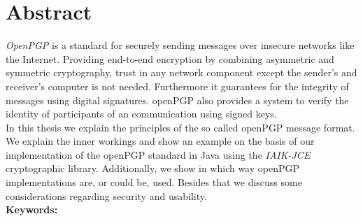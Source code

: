 

\chapter*{Abstract}
\label{cha:abstract}



\emph{OpenPGP} is a standard for securely sending messages over insecure networks like the Internet. Providing end-to-end encryption by combining asymmetric and symmetric cryptography, trust in any network component except the sender's and receiver's computer is not needed. Furthermore it guarantees for the integrity of messages using digital signatures. openPGP also provides a system to verify the identity of participants of an communication using signed keys. \\
 
 
 In this thesis we explain the principles of the so called openPGP message format. 
 We explain the inner workings and show an example on the basis of our implementation 
 of the openPGP standard in Java using the \emph{IAIK-JCE} cryptographic library. 
 Additionally, we show in which way openPGP implementations are, or could be, used.
 Besides that we discuss some considerations regarding security and usability. \\






\textbf{Keywords:} \mykeywords

